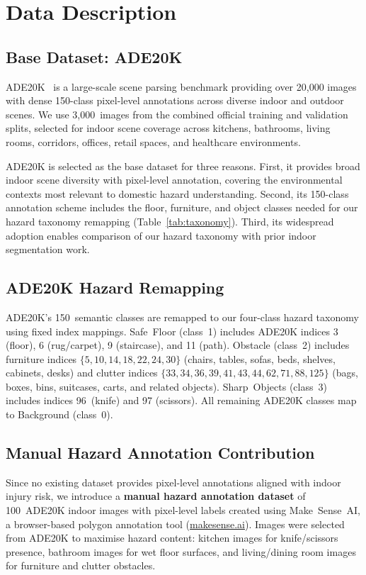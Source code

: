 \section{Data Description}
\label{sec:data}

\subsection{Base Dataset: ADE20K}

ADE20K~\cite{zhou2017scene} is a large-scale scene parsing benchmark
providing over 20,000 images with dense 150-class pixel-level
annotations across diverse indoor and outdoor scenes. We use
3,000~images from the combined official training and validation
splits, selected for indoor scene coverage across kitchens, bathrooms,
living rooms, corridors, offices, retail spaces, and healthcare
environments.

ADE20K is selected as the base dataset for three reasons.
First, it provides broad indoor scene diversity with pixel-level
annotation, covering the environmental contexts most relevant to
domestic hazard understanding. Second, its 150-class annotation
scheme includes the floor, furniture, and object classes needed
for our hazard taxonomy remapping (Table~\ref{tab:taxonomy}).
Third, its widespread adoption enables comparison of our hazard
taxonomy with prior indoor segmentation work.

\subsection{ADE20K Hazard Remapping}

ADE20K's 150~semantic classes are remapped to our four-class hazard
taxonomy using fixed index mappings. Safe~Floor (class~1) includes
ADE20K indices 3 (floor), 6 (rug/carpet), 9 (staircase), and 11
(path). Obstacle (class~2) includes furniture indices
$\{5, 10, 14, 18, 22, 24, 30\}$ (chairs, tables, sofas, beds,
shelves, cabinets, desks) and clutter indices
$\{33, 34, 36, 39, 41, 43, 44, 62, 71, 88, 125\}$ (bags, boxes,
bins, suitcases, carts, and related objects).
Sharp~Objects (class~3) includes indices 96~(knife) and 97
(scissors). All remaining ADE20K classes map to Background (class~0).

\subsection{Manual Hazard Annotation Contribution}

Since no existing dataset provides pixel-level annotations aligned
with indoor injury risk, we introduce a \textbf{manual hazard
annotation dataset} of 100~ADE20K indoor images with pixel-level
labels created using Make~Sense~AI, a browser-based polygon
annotation tool (\url{makesense.ai}). Images were selected from
ADE20K to maximise hazard content: kitchen images for knife/scissors
presence, bathroom images for wet floor surfaces, and
living/dining room images for furniture and clutter obstacles.

